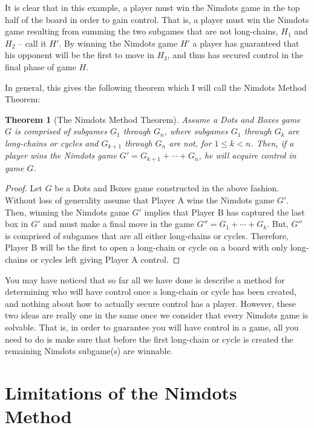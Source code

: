 \documentclass[12pt,twoside]{reedthesis}
\newtheorem{theorem}{Theorem}
\begin{document}
It is clear that in this example, a player must win the Nimdots game in the top half of the board in order to gain control.  That is, a player must win the Nimdots game resulting from summing the two subgames that are not long-chains, $H_1$ and $H_2$ -- call it $H'$.  By winning the Nimdots game $H'$ a player has guaranteed that his opponent will be the first to move in $H_3$, and thus has secured control in the final phase of game $H$.

In general, this gives the following theorem which I will call the Nimdots Method Theorem:

\begin{theorem}[The Nimdots Method Theorem]
Assume a Dots and Boxes game $G$ is comprised of subgames $G_1$ through $G_n$, where subgames $G_1$ through $G_k$ are long-chains or cycles and $G_{k+1}$ through $G_n$ are not, for $1 \leq k < n$.  Then, if a player wins the Nimdots game $G'=G_{k+1}+\cdots+G_n$, he will acquire control in game $G$.
\end{theorem}

\begin{proof}
Let $G$ be a Dots and Boxes game constructed in the above fashion.  Without loss of generality assume that Player A wins the Nimdots game $G'$.  Then, winning the Nimdots game $G'$ implies that Player B has captured the last box in $G'$ and must make a final move in the game $G''=G_1+\cdots+G_k$.  But, $G''$ is comprised of subgames that are all either long-chains or cycles.  Therefore, Player B will be the first to open a long-chain or cycle on a board with only long-chains or cycles left giving Player A control.
\end{proof}

You may have noticed that so far all we have done is describe a method for determining who will have control once a long-chain or cycle has been created, and nothing about how to actually secure control has a player.  However, these two ideas are really one in the same once we consider that every Nimdots game is solvable.  That is, in order to guarantee you will have control in a game, all you need to do is make sure that before the first long-chain or cycle is created the remaining Nimdots subgame(s) are winnable.  


\newpage
\section{Limitations of the Nimdots Method}
\end{document}
